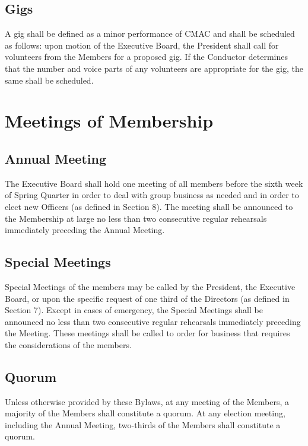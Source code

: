 \documentclass{article}
\begin{document}
\subsection{Gigs}

A gig shall be defined as a minor performance of CMAC and shall be
scheduled as follows: upon motion of the Executive Board, the President
shall call for volunteers from the Members for a proposed gig. If
the Conductor determines that the number and voice parts of any volunteers
are appropriate for the gig, the same shall be scheduled.

\section{Meetings of Membership}

\subsection{Annual Meeting}

The Executive Board shall hold one meeting of all members before the
sixth week of Spring Quarter in order to deal with group business
as needed and in order to elect new Officers (as defined in Section
8). The meeting shall be announced to the Membership at large no less
than two consecutive regular rehearsals immediately preceding the
Annual Meeting.

\subsection{Special Meetings}

Special Meetings of the members may be called by the President, the
Executive Board, or upon the specific request of one third of the
Directors (as defined in Section 7). Except in cases of emergency, the Special Meetings shall be announced no less
than two consecutive regular rehearsals immediately preceding the
Meeting. These meetings shall be called to order for business that requires the considerations of the members.

\subsection{Quorum}

Unless otherwise provided by these Bylaws, at any meeting of the Members,
a majority of the Members shall constitute a quorum. At any election
meeting, including the Annual Meeting, two-thirds of the Members shall
constitute a quorum.
\end{document}
